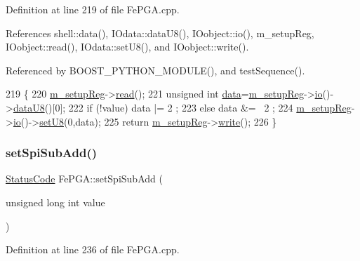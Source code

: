 Definition at line 219 of file Fe\+P\+G\+A.\+cpp.



References shell\+::data(), I\+Odata\+::data\+U8(), I\+Oobject\+::io(), m\+\_\+setup\+Reg, I\+Oobject\+::read(), I\+Odata\+::set\+U8(), and I\+Oobject\+::write().



Referenced by B\+O\+O\+S\+T\+\_\+\+P\+Y\+T\+H\+O\+N\+\_\+\+M\+O\+D\+U\+L\+E(), and test\+Sequence().


\begin{DoxyCode}
219                                           \{
220   \hyperlink{classFePGA_a0255fe229013986b4387c3a75ddf4e97}{m\_setupReg}->\hyperlink{classIOobject_aa07610c11963b1db6710e3c76ceea456}{read}();
221   \textcolor{keywordtype}{unsigned} \textcolor{keywordtype}{int} \hyperlink{namespaceshell_a5ea2525995cedc3efd69ea8a7f034d1e}{data}=\hyperlink{classFePGA_a0255fe229013986b4387c3a75ddf4e97}{m\_setupReg}->\hyperlink{classIOobject_af04fb94137c3d86849f478ac5afab5d1}{io}()->\hyperlink{classIOdata_a75e9c318dbac3a39402179070943d4bc}{dataU8}()[0];
222   \textcolor{keywordflow}{if} (!value) data |=  2 ;
223   \textcolor{keywordflow}{else}        data &= ~2 ;
224   \hyperlink{classFePGA_a0255fe229013986b4387c3a75ddf4e97}{m\_setupReg}->\hyperlink{classIOobject_af04fb94137c3d86849f478ac5afab5d1}{io}()->\hyperlink{classIOdata_a6c4fb2f2af01889ada889c2b7aceb24d}{setU8}(0,data);
225   \textcolor{keywordflow}{return} \hyperlink{classFePGA_a0255fe229013986b4387c3a75ddf4e97}{m\_setupReg}->\hyperlink{classIOobject_a9f6984bc9f0fadcf800f1be2523ac744}{write}();
226 \}
\end{DoxyCode}
\mbox{\label{classFePGA_ad0a662adc6070427f0e1962c20a92de6}} 
\subsubsection{\texorpdfstring{set\+Spi\+Sub\+Add()}{setSpiSubAdd()}}
{\footnotesize\ttfamily \hyperlink{classStatusCode}{Status\+Code} Fe\+P\+G\+A\+::set\+Spi\+Sub\+Add (\begin{DoxyParamCaption}\item[{unsigned long int}]{value }\end{DoxyParamCaption})}



Definition at line 236 of file Fe\+P\+G\+A.\+cpp.



